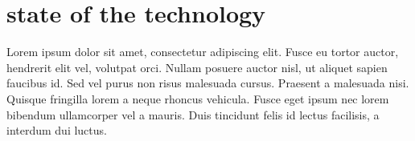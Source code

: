 \chapter{state of the technology}
\label{chap:state_of_the_technology}
Lorem ipsum dolor sit amet, consectetur adipiscing elit. Fusce eu tortor auctor,
hendrerit elit vel, volutpat orci. Nullam posuere auctor nisl, ut aliquet sapien
faucibus id. Sed vel purus non risus malesuada cursus. Praesent a malesuada
nisi. Quisque fringilla lorem a neque rhoncus vehicula. Fusce eget ipsum nec
lorem bibendum ullamcorper vel a mauris. Duis tincidunt felis id lectus
facilisis, a interdum dui luctus.